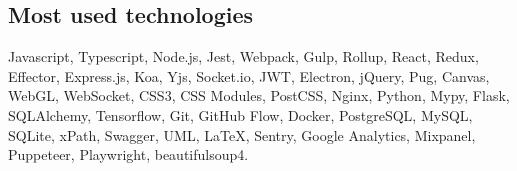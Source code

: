 \documentclass{vitonsky}
\begin{document}
\subsection*{Most used technologies}

Javascript, Typescript, Node.js, Jest, Webpack, Gulp, Rollup,
React, Redux, Effector, Express.js, Koa, Yjs, Socket.io, JWT, Electron, jQuery, Pug,
Canvas, WebGL, WebSocket, CSS3, CSS Modules, PostCSS,
Nginx, Python, Mypy, Flask, SQLAlchemy, Tensorflow, Git, GitHub Flow, Docker, PostgreSQL, MySQL, SQLite, xPath, Swagger, UML, LaTeX,
Sentry, Google Analytics, Mixpanel, Puppeteer, Playwright, beautifulsoup4.
\end{document}

